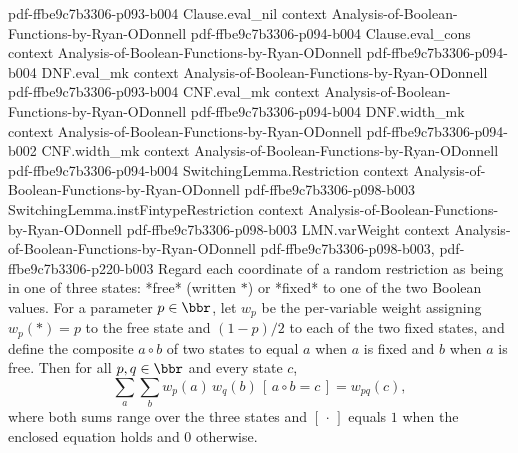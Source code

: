 \begin{lemma}
  {pdf-ffbe9c7b3306-p093-b004}
\proofstep
  {Clause.eval_nil}
  {context}
  {Analysis-of-Boolean-Functions-by-Ryan-ODonnell}
  {pdf-ffbe9c7b3306-p094-b004}
\proofstep
  {Clause.eval_cons}
  {context}
  {Analysis-of-Boolean-Functions-by-Ryan-ODonnell}
  {pdf-ffbe9c7b3306-p094-b004}
\proofstep
  {DNF.eval_mk}
  {context}
  {Analysis-of-Boolean-Functions-by-Ryan-ODonnell}
  {pdf-ffbe9c7b3306-p093-b004}
\proofstep
  {CNF.eval_mk}
  {context}
  {Analysis-of-Boolean-Functions-by-Ryan-ODonnell}
  {pdf-ffbe9c7b3306-p094-b004}
\proofstep
  {DNF.width_mk}
  {context}
  {Analysis-of-Boolean-Functions-by-Ryan-ODonnell}
  {pdf-ffbe9c7b3306-p094-b002}
\proofstep
  {CNF.width_mk}
  {context}
  {Analysis-of-Boolean-Functions-by-Ryan-ODonnell}
  {pdf-ffbe9c7b3306-p094-b004}
\proofstep
  {SwitchingLemma.Restriction}
  {context}
  {Analysis-of-Boolean-Functions-by-Ryan-ODonnell}
  {pdf-ffbe9c7b3306-p098-b003}
\proofstep
  {SwitchingLemma.instFintypeRestriction}
  {context}
  {Analysis-of-Boolean-Functions-by-Ryan-ODonnell}
  {pdf-ffbe9c7b3306-p098-b003}
\proofstep
  {LMN.varWeight}
  {context}
  {Analysis-of-Boolean-Functions-by-Ryan-ODonnell}
  {pdf-ffbe9c7b3306-p098-b003,
    pdf-ffbe9c7b3306-p220-b003}
Regard each coordinate of a random restriction as being in one of three states: *free*
(written $\ast$) or *fixed* to one of the two Boolean values. For a parameter $p \in
\bbr$, let $w_p$ be the per-variable weight assigning $w_p(\ast) = p$ to the free state
and $(1-p)/2$ to each of the two fixed states, and define the composite $a \circ b$ of
two states to equal $a$ when $a$ is fixed and $b$ when $a$ is free. Then for all $p, q
\in \bbr$ and every state $c$,
\[
  \sum_{a}\sum_{b} w_p(a)\, w_q(b)\, [\,a \circ b = c\,] = w_{pq}(c),
\]
where both sums range over the three states and $[\,\cdot\,]$ equals $1$ when the
enclosed equation holds and $0$ otherwise.
\end{lemma}


